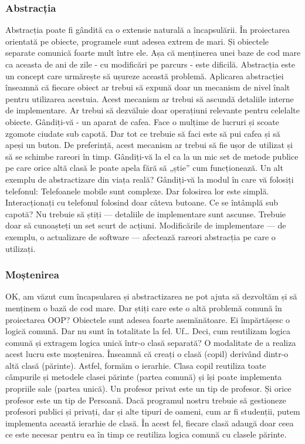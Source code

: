 \subsubsection{ Abstracția }
Abstracția poate fi gândită ca o extensie naturală a încapsulării. În
proiectarea orientată pe obiecte, programele sunt adesea extrem de mari. Și
obiectele separate comunică foarte mult între ele. Așa că menținerea unei baze
de cod mare ca aceasta de ani de zile - cu modificări pe parcurs - este
dificilă. Abstracția este un concept care urmărește să ușureze această
problemă. Aplicarea abstracției înseamnă că fiecare obiect ar trebui să expună
doar un mecanism de nivel înalt pentru utilizarea acestuia. Acest mecanism ar
trebui să ascundă detaliile interne de implementare. Ar trebui să dezvăluie
doar operațiuni relevante pentru celelalte obiecte. Gândiți-vă - un aparat de
cafea. Face o mulțime de lucruri și scoate zgomote ciudate sub capotă. Dar tot
ce trebuie să faci este să pui cafea și să apeși un buton. De preferință, acest
mecanism ar trebui să fie ușor de utilizat și să se schimbe rareori în timp.
Gândiți-vă la el ca la un mic set de metode publice pe care orice altă clasă le
poate apela fără să „știe” cum funcționează. Un alt exemplu de abstractizare
din viața reală? Gândiți-vă la modul în care vă folosiți telefonul: Telefoanele
mobile sunt complexe. Dar folosirea lor este simplă. Interacționați cu
telefonul folosind doar câteva butoane. Ce se întâmplă sub capotă? Nu trebuie
să știți — detaliile de implementare sunt ascunse. Trebuie doar să cunoașteți
un set scurt de acțiuni. Modificările de implementare — de exemplu, o
actualizare de software — afectează rareori abstracția pe care o utilizați.

\subsubsection{ Moștenirea }
OK, am văzut cum încapsularea și abstractizarea ne pot ajuta să dezvoltăm și să
menținem o bază de cod mare. Dar știți care este o altă problemă comună în
proiectarea OOP? Obiectele sunt adesea foarte asemănătoare. Ei împărtășesc o
logică comună. Dar nu sunt în totalitate la fel. Uf… Deci, cum reutilizam
logica comună și extragem logica unică într-o clasă separată? O modalitate de a
realiza acest lucru este moștenirea. Înseamnă că creați o clasă (copil)
derivând dintr-o altă clasă (părinte). Astfel, formăm o ierarhie. Clasa copil
reutiliza toate câmpurile și metodele clasei părinte (partea comună) și își
poate implementa propriile sale (partea unică). Un profesor privat este un tip
de profesor. Și orice profesor este un tip de Persoană. Dacă programul nostru
trebuie să gestioneze profesori publici și privați, dar și alte tipuri de
oameni, cum ar fi studenții, putem implementa această ierarhie de clasă. În
acest fel, fiecare clasă adaugă doar ceea ce este necesar pentru ea în timp ce
reutiliza logica comună cu clasele părinte.

